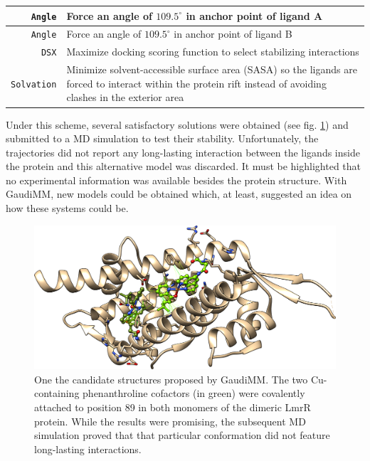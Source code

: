 \begin{table}[hbtp]
\begin{tabularx}{\textwidth}{RL}
		\midrule
		\texttt{Angle} & Force an angle of $109.5^\circ$ in anchor point of ligand A \\
		\midrule
		\texttt{Angle} & Force an angle of $109.5^\circ$ in anchor point of ligand B \\
		\midrule
		\texttt{DSX} & Maximize docking scoring function to select stabilizing interactions \\
		\midrule
		\texttt{Solvation} & Minimize solvent-accessible surface area (SASA) so the ligands are forced to interact within the protein rift instead of avoiding clashes in the exterior area \\
		\bottomrule
	\end{tabularx}
\end{table}

Under this scheme, several satisfactory solutions were obtained (see fig. \ref{fig:phenanthroline}) and submitted to a MD simulation to test their stability. Unfortunately, the trajectories did not report any long-lasting interaction between the ligands inside the protein and this alternative model was discarded. It must be highlighted that no experimental information was available besides the protein structure. With GaudiMM, new models could be obtained which, at least, suggested an idea on how these systems could be.

\begin{figure}[H]
	\begin{Center}
		\includegraphics[width=\textwidth]{./figures/06/dual_phn.png}
	\end{Center}
	\caption[Proposed Cu-containing phenanthroline cofactors]{One the candidate structures proposed by GaudiMM. The two Cu-containing phenanthroline cofactors (in green) were covalently attached to position 89 in both monomers of the dimeric LmrR protein. While the results were promising, the subsequent MD simulation proved that that particular conformation did not feature long-lasting interactions.}
	\label{fig:phenanthroline}
\end{figure}

